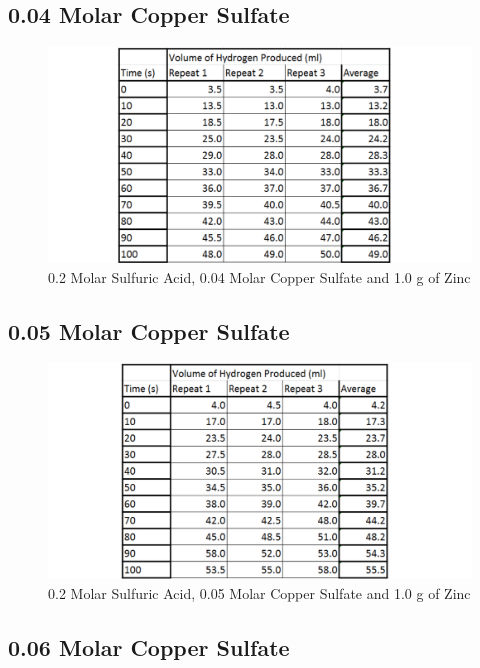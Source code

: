	\subsection{0.04 Molar Copper Sulfate}

\begin{figure}[H]
    \includegraphics[width=\textwidth]{./Experiment/Images/3ChangeCatalyst/004Molar.pdf}
    \caption{0.2 Molar Sulfuric Acid, 0.04 Molar Copper Sulfate and 1.0 g of Zinc} \label{fig:004MolarCSRawData}
\end{figure}

	\subsection{0.05 Molar Copper Sulfate}

\begin{figure}[H]
    \includegraphics[width=\textwidth]{./Experiment/Images/3ChangeCatalyst/005Molar.pdf}
    \caption{0.2 Molar Sulfuric Acid, 0.05 Molar Copper Sulfate and 1.0 g of Zinc} \label{fig:005MolarCSRawData}
\end{figure}

	\subsection{0.06 Molar Copper Sulfate}

